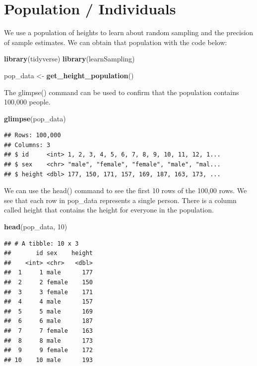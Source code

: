 \documentclass[
]{krantz}
\makeatletter
\newenvironment{Shaded}{\begin{snugshade}}{\end{snugshade}}
\newcommand{\DecValTok}[1]{\textcolor[rgb]{0.06,0.06,0.06}{#1}}
\newcommand{\KeywordTok}[1]{\textcolor[rgb]{0.27,0.27,0.27}{\textbf{#1}}}
\newcommand{\NormalTok}[1]{#1}
\newcommand{\StringTok}[1]{\textcolor[rgb]{0.5,0.5,0.5}{#1}}
\newenvironment{kframe}{%
\medskip{}
\setlength{\fboxsep}{.8em}
 \def\at@end@of@kframe{}%
 \ifinner\ifhmode%
  \def\at@end@of@kframe{\end{minipage}}%
  \begin{minipage}{\columnwidth}%
 \fi\fi%
 \def\FrameCommand##1{\hskip\@totalleftmargin \hskip-\fboxsep
 \colorbox{shadecolor}{##1}\hskip-\fboxsep
     \hskip-\linewidth \hskip-\@totalleftmargin \hskip\columnwidth}%
 \MakeFramed {\advance\hsize-\width
   \@totalleftmargin\z@ \linewidth\hsize
   \@setminipage}}%
 {\par\unskip\endMakeFramed%
 \at@end@of@kframe}
\renewenvironment{Shaded}{\begin{kframe}}{\end{kframe}}
\makeatother
\begin{document}
\hypertarget{population-individuals}{%
\section{Population / Individuals}\label{population-individuals}}

We use a population of heights to learn about random sampling and the precision of sample estimates. We can obtain that population with the code below:

\begin{Shaded}
\begin{Highlighting}[]
\KeywordTok{library}\NormalTok{(tidyverse)}
\KeywordTok{library}\NormalTok{(learnSampling)}

\NormalTok{pop_data <-}\StringTok{ }\KeywordTok{get_height_population}\NormalTok{() }
\end{Highlighting}
\end{Shaded}

The glimpse() command can be used to confirm that the population contains 100,000 people.

\begin{Shaded}
\begin{Highlighting}[]
\KeywordTok{glimpse}\NormalTok{(pop_data)}
\end{Highlighting}
\end{Shaded}

\begin{verbatim}
## Rows: 100,000
## Columns: 3
## $ id     <int> 1, 2, 3, 4, 5, 6, 7, 8, 9, 10, 11, 12, 1...
## $ sex    <chr> "male", "female", "female", "male", "mal...
## $ height <dbl> 177, 150, 171, 157, 169, 187, 163, 173, ...
\end{verbatim}

We can use the head() command to see the first 10 rows of the 100,00 rows. We see that each row in pop\_data represents a single person. There is a column called height that contains the height for everyone in the population.

\begin{Shaded}
\begin{Highlighting}[]
\KeywordTok{head}\NormalTok{(pop_data, }\DecValTok{10}\NormalTok{)}
\end{Highlighting}
\end{Shaded}

\begin{verbatim}
## # A tibble: 10 x 3
##       id sex    height
##    <int> <chr>   <dbl>
##  1     1 male      177
##  2     2 female    150
##  3     3 female    171
##  4     4 male      157
##  5     5 male      169
##  6     6 male      187
##  7     7 female    163
##  8     8 male      173
##  9     9 female    172
## 10    10 male      193
\end{verbatim}
\end{document}

